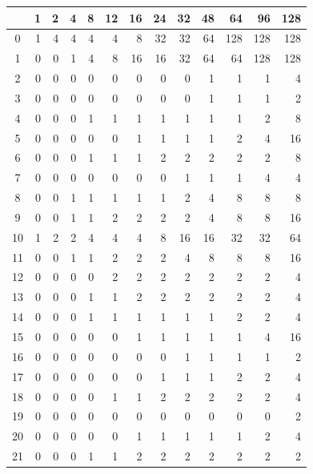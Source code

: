 \documentclass[11pt,a4paper,openright,twoside]{book}
\numberwithin{equation}{section} %
\numberwithin{figure}{section} %
\numberwithin{table}{section} %
\begin{document}
\begin{table}[h]
	\centering
	\small
	\def\arraystretch{0.85}
	\begin{tabular}{c|rrrrrrrrrrrr}
		\diagbox{\acs{IPM}}{System} &
		1 & 2 & 4 & 8  & 12 & 16 & 24 & 32 & 48 & 64 & 96 & 128 \\
		\hline
		0  & 1 & 4 & 4 & 4 & 4 & 8  & 32 & 32 & 64 & 128 & 128 & 128 \\
		1  & 0 & 0 & 1 & 4 & 8 & 16 & 16 & 32 & 64 & 64  & 128 & 128 \\
		2  & 0 & 0 & 0 & 0 & 0 & 0  & 0  & 0  & 1  & 1   & 1   & 4 \\
		3  & 0 & 0 & 0 & 0 & 0 & 0  & 0  & 0  & 1  & 1   & 1   & 2 \\
		4  & 0 & 0 & 0 & 1 & 1 & 1  & 1  & 1  & 1  & 1   & 2   & 8 \\
		5  & 0 & 0 & 0 & 0 & 0 & 1  & 1  & 1  & 1  & 2   & 4   & 16 \\
		6  & 0 & 0 & 0 & 1 & 1 & 1  & 2  & 2  & 2  & 2   & 2   & 8 \\
		7  & 0 & 0 & 0 & 0 & 0 & 0  & 0  & 1  & 1  & 1   & 4   & 4 \\
		8  & 0 & 0 & 1 & 1 & 1 & 1  & 1  & 2  & 4  & 8   & 8   & 8 \\
		9  & 0 & 0 & 1 & 1 & 2 & 2  & 2  & 2  & 4  & 8   & 8   & 16 \\
		10 & 1 & 2 & 2 & 4 & 4 & 4  & 8  & 16 & 16 & 32  & 32  & 64 \\
		11 & 0 & 0 & 1 & 1 & 2 & 2  & 2  & 4  & 8  & 8   & 8   & 16 \\
		12 & 0 & 0 & 0 & 0 & 2 & 2  & 2  & 2  & 2  & 2   & 2   & 4 \\
		13 & 0 & 0 & 0 & 1 & 1 & 2  & 2  & 2  & 2  & 2   & 2   & 4 \\
		14 & 0 & 0 & 0 & 1 & 1 & 1  & 1  & 1  & 1  & 2   & 2   & 4 \\
		15 & 0 & 0 & 0 & 0 & 0 & 1  & 1  & 1  & 1  & 1   & 4   & 16 \\
		16 & 0 & 0 & 0 & 0 & 0 & 0  & 0  & 1  & 1  & 1   & 1   & 2 \\
		17 & 0 & 0 & 0 & 0 & 0 & 0  & 1  & 1  & 1  & 2   & 2   & 4 \\
		18 & 0 & 0 & 0 & 0 & 1 & 1  & 2  & 2  & 2  & 2   & 2   & 4 \\
		19 & 0 & 0 & 0 & 0 & 0 & 0  & 0  & 0  & 0  & 0   & 0   & 2 \\
		20 & 0 & 0 & 0 & 0 & 0 & 1  & 1  & 1  & 1  & 1   & 2   & 4 \\
		21 & 0 & 0 & 0 & 1 & 1 & 2  & 2  & 2  & 2  & 2   & 2   & 2 \\

\end{tabular}
\end{table}
\end{document}
